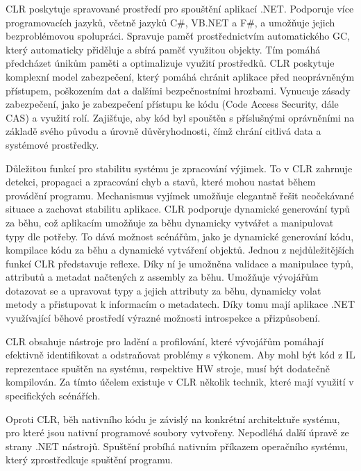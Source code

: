 CLR poskytuje spravované prostředí pro spouštění aplikací .NET. Podporuje více programovacích jazyků, včetně jazyků C\#, VB.NET a F\#, a umožňuje jejich bezproblémovou spolupráci. Spravuje paměť prostřednictvím automatického GC, který automaticky přiděluje a sbírá paměť využitou objekty. \cite{Richter2012} Tím pomáhá předcházet únikům paměti a optimalizuje využití prostředků. CLR poskytuje komplexní model zabezpečení, který pomáhá chránit aplikace před neoprávněným přístupem, poškozením dat a dalšími bezpečnostními hrozbami. Vynucuje zásady zabezpečení, jako je zabezpečení přístupu ke kódu (Code Access Security, dále CAS) a využití rolí. \cite{Richter2012} Zajišťuje, aby kód byl spouštěn s příslušnými oprávněními na základě svého původu a úrovně důvěryhodnosti, čímž chrání citlivá data a systémové prostředky.

Důležitou funkcí pro stabilitu systému je zpracování výjimek. To v CLR zahrnuje detekci, propagaci a zpracování chyb a stavů, které mohou nastat během provádění programu. Mechanismus vyjímek umožňuje elegantně řešit neočekávané situace a zachovat stabilitu aplikace. CLR podporuje dynamické generování typů za běhu, což aplikacím umožňuje za běhu dynamicky vytvářet a manipulovat typy dle potřeby. \cite{Richter2012} To dává možnost scénářům, jako je dynamické generování kódu, kompilace kódu za běhu a dynamické vytváření objektů. Jednou z nejdůležitějších funkcí CLR představuje reflexe. Díky ní je umožněna validace a manipulace typů, attributů a metadat načtených z assembly za běhu. \cite{Richter2012} Umožňuje vývojářům dotazovat se a upravovat typy a jejich attributy za běhu, dynamicky volat metody a přistupovat k informacím o metadatech. Díky tomu mají aplikace .NET využívající běhové prostředí výrazné možnosti introspekce a přizpůsobení.

CLR obsahuje nástroje pro ladění a profilování, které vývojářům pomáhají efektivně identifikovat a odstraňovat problémy s výkonem. Aby mohl být kód z IL reprezentace spuštěn na systému, respektive HW stroje, musí být dodatečně kompilován. Za tímto účelem existuje v CLR několik technik, které mají využití v specifických scénářích.

Oproti CLR, běh nativního kódu je závislý na konkrétní architektuře systému, pro které jsou nativní programové soubory vytvořeny. Nepodléhá další úpravě ze strany .NET nástrojů. Spuštění probíhá nativním příkazem operačního systému, který zprostředkuje spuštění programu.


